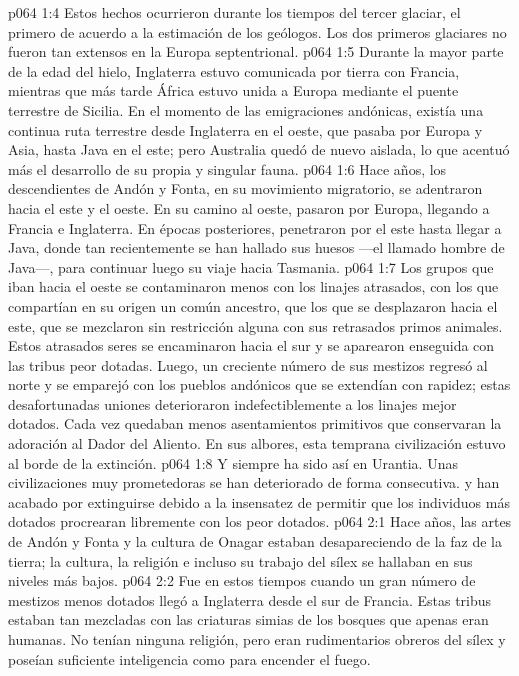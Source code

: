 \vs p064 1:4 \pc Estos hechos ocurrieron durante los tiempos del tercer glaciar, el primero de acuerdo a la estimación de los geólogos. Los dos primeros glaciares no fueron tan extensos en la Europa septentrional.
\vs p064 1:5 Durante la mayor parte de la edad del hielo, Inglaterra estuvo comunicada por tierra con Francia, mientras que más tarde África estuvo unida a Europa mediante el puente terrestre de Sicilia. En el momento de las emigraciones andónicas, existía una continua ruta terrestre desde Inglaterra en el oeste, que pasaba por Europa y Asia, hasta Java en el este; pero Australia quedó de nuevo aislada, lo que acentuó más el desarrollo de su propia y singular fauna.
\vs p064 1:6 \pc Hace  años, los descendientes de Andón y Fonta, en su movimiento migratorio, se adentraron hacia el este y el oeste. En su camino al oeste, pasaron por Europa, llegando a Francia e Inglaterra. En épocas posteriores, penetraron por el este hasta llegar a Java, donde tan recientemente se han hallado sus huesos ---el llamado hombre de Java---, para continuar luego su viaje hacia Tasmania.
\vs p064 1:7 Los grupos que iban hacia el oeste se contaminaron menos con los linajes atrasados, con los que compartían en su origen un común ancestro, que los que se desplazaron hacia el este, que se mezclaron sin restricción alguna con sus retrasados primos animales. Estos atrasados seres se encaminaron hacia el sur y se aparearon enseguida con las tribus peor dotadas. Luego, un creciente número de sus mestizos regresó al norte y se emparejó con los pueblos andónicos que se extendían con rapidez; estas desafortunadas uniones deterioraron indefectiblemente a los linajes mejor dotados. Cada vez quedaban menos asentamientos primitivos que conservaran la adoración al Dador del Aliento. En sus albores, esta temprana civilización estuvo al borde de la extinción.
\vs p064 1:8 Y siempre ha sido así en Urantia. Unas civilizaciones muy prometedoras se han deteriorado de forma consecutiva. y han acabado por extinguirse debido a la insensatez de permitir que los individuos más dotados procrearan libremente con los peor dotados.
\vs p064 2:1 Hace  años, las artes de Andón y Fonta y la cultura de Onagar estaban desapareciendo de la faz de la tierra; la cultura, la religión e incluso su trabajo del sílex se hallaban en sus niveles más bajos.
\vs p064 2:2 Fue en estos tiempos cuando un gran número de mestizos menos dotados llegó a Inglaterra desde el sur de Francia. Estas tribus estaban tan mezcladas con las criaturas simias de los bosques que apenas eran humanas. No tenían ninguna religión, pero eran rudimentarios obreros del sílex y poseían suficiente inteligencia como para encender el fuego.
